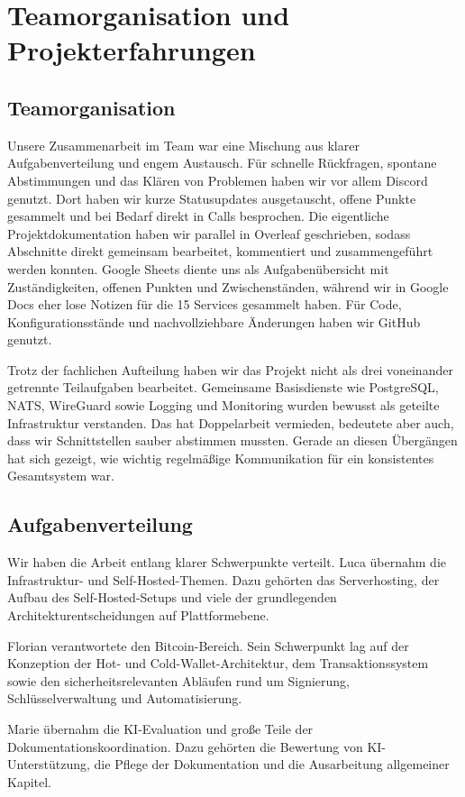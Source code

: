 
\chapter{Teamorganisation und Projekterfahrungen}

\section{Teamorganisation}
Unsere Zusammenarbeit im Team war eine Mischung aus klarer Aufgabenverteilung und engem Austausch. Für schnelle Rückfragen, spontane Abstimmungen und das Klären von Problemen haben wir vor allem Discord genutzt. Dort haben wir kurze Statusupdates ausgetauscht, offene Punkte gesammelt und bei Bedarf direkt in Calls besprochen. Die eigentliche Projektdokumentation haben wir parallel in Overleaf geschrieben, sodass Abschnitte direkt gemeinsam bearbeitet, kommentiert und zusammengeführt werden konnten. Google Sheets diente uns als Aufgabenübersicht mit Zuständigkeiten, offenen Punkten und Zwischenständen, während wir in Google Docs eher lose Notizen für die 15 Services gesammelt haben. Für Code, Konfigurationsstände und nachvollziehbare Änderungen haben wir GitHub genutzt.

Trotz der fachlichen Aufteilung haben wir das Projekt nicht als drei voneinander getrennte Teilaufgaben bearbeitet. Gemeinsame Basisdienste wie PostgreSQL, NATS, WireGuard sowie Logging und Monitoring wurden bewusst als geteilte Infrastruktur verstanden. Das hat Doppelarbeit vermieden, bedeutete aber auch, dass wir Schnittstellen sauber abstimmen mussten. Gerade an diesen Übergängen hat sich gezeigt, wie wichtig regelmäßige Kommunikation für ein konsistentes Gesamtsystem war.

\section{Aufgabenverteilung}
Wir haben die Arbeit entlang klarer Schwerpunkte verteilt. Luca übernahm die Infrastruktur- und Self-Hosted-Themen. Dazu gehörten das Serverhosting, der Aufbau des Self-Hosted-Setups und viele der grundlegenden Architekturentscheidungen auf Plattformebene.

Florian verantwortete den Bitcoin-Bereich. Sein Schwerpunkt lag auf der Konzeption der Hot- und Cold-Wallet-Architektur, dem Transaktionssystem sowie den sicherheitsrelevanten Abläufen rund um Signierung, Schlüsselverwaltung und Automatisierung.

Marie übernahm die KI-Evaluation und große Teile der Dokumentationskoordination. Dazu gehörten die Bewertung von KI-Unterstützung, die Pflege der Dokumentation und die Ausarbeitung allgemeiner Kapitel.

